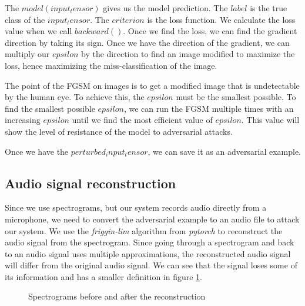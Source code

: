 The $model(input_tensor)$ gives us the model prediction. The $label$ is the true class of the $input_tensor$. The $criterion$ is the loss function. We calculate the loss value when we call $backward()$. Once we find the loss, we can find the gradient direction by taking its sign. Once we have the direction of the gradient, we can multiply our $epsilon$ by the direction to find an image modified to maximize the loss, hence maximizing the miss-classification of the image.

The point of the FGSM on images is to get a modified image that is undetectable by the human eye. To achieve this, the $epsilon$ must be the smallest possible. To find the smallest possible $epsilon$, we can run the FGSM multiple times with an increasing $epsilon$ until we find the most efficient value of $epsilon$. This value will show the level of resistance of the model to adversarial attacks.

Once we have the $perturbed_input_tensor$, we can save it as an adversarial example.

\subsection{Audio signal reconstruction}

Since we use spectrograms, but our system records audio directly from a microphone, we need to convert the adversarial example to an audio file to attack our system. We use the \textit{friggin-lim} algorithm from \textit{pytorch} to reconstruct the audio signal from the spectrogram. Since going through a spectrogram and back to an audio signal uses multiple approximations, the reconstructed audio signal will differ from the original audio signal. We can see that the signal loses some of its information and has a smaller definition in figure \ref{fig:reconstructed_audio_signal}.

\begin{figure}[H]
    \centering
    \qquad
    \caption{Spectrograms before and after the reconstruction}
    \label{fig:reconstructed_audio_signal}
\end{figure}

